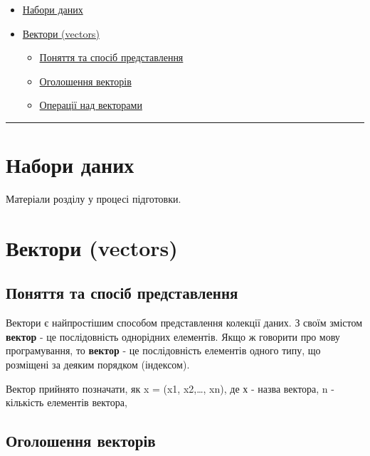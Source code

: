 \documentclass[
]{book}
\providecommand{\tightlist}{%
  \setlength{\itemsep}{0pt}\setlength{\parskip}{0pt}}
\begin{document}
\begin{itemize}
\tightlist
\item
  \protect\hyperlink{chapter31}{Набори даних}
\item
  \protect\hyperlink{chapter32}{Вектори (vectors)}

  \begin{itemize}
  \tightlist
  \item
    \protect\hyperlink{chapter321}{Поняття та спосіб представлення}
  \item
    \protect\hyperlink{chapter322}{Оголошення векторів}
  \item
    \protect\hyperlink{chapter323}{Операції над векторами}
  \end{itemize}
\end{itemize}

\begin{center}\rule{0.5\linewidth}{0.5pt}\end{center}

\hypertarget{chapter31}{%
\section{Набори даних}\label{chapter31}}

Матеріали розділу у процесі підготовки.

\hypertarget{chapter32}{%
\section{Вектори (vectors)}\label{chapter32}}

\hypertarget{chapter321}{%
\subsection{Поняття та спосіб представлення}\label{chapter321}}

Вектори є найпростішим способом представлення колекції даних. З своїм змістом \textbf{вектор} - це послідовність однорідних елементів. Якщо ж говорити про мову програмування, то \textbf{вектор} - це послідовність елементів одного типу, що розміщені за деяким порядком (індексом).

Вектор прийнято позначати, як x = (x1, x2,\ldots, xn), де х - назва вектора, n - кількість елементів вектора,

\hypertarget{chapter322}{%
\subsection{Оголошення векторів}\label{chapter322}}
\end{document}
